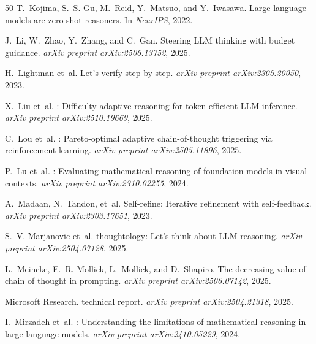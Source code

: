 \documentclass[11pt]{article}
\begin{document}
\begin{thebibliography}{50}
T.~Kojima, S.~S. Gu, M.~Reid, Y.~Matsuo, and Y.~Iwasawa.
\newblock Large language models are zero-shot reasoners.
\newblock In \emph{NeurIPS}, 2022.

J.~Li, W.~Zhao, Y.~Zhang, and C.~Gan.
\newblock Steering {LLM} thinking with budget guidance.
\newblock \emph{arXiv preprint arXiv:2506.13752}, 2025.

H.~Lightman et~al.
\newblock Let's verify step by step.
\newblock \emph{arXiv preprint arXiv:2305.20050}, 2023.

X.~Liu et~al.
: Difficulty-adaptive reasoning for token-efficient {LLM} inference.
\newblock \emph{arXiv preprint arXiv:2510.19669}, 2025.

C.~Lou et~al.
: Pareto-optimal adaptive chain-of-thought triggering via reinforcement learning.
\newblock \emph{arXiv preprint arXiv:2505.11896}, 2025.

P.~Lu et~al.
: Evaluating mathematical reasoning of foundation models in visual contexts.
\newblock \emph{arXiv preprint arXiv:2310.02255}, 2024.

A.~Madaan, N.~Tandon, et~al.
\newblock Self-refine: Iterative refinement with self-feedback.
\newblock \emph{arXiv preprint arXiv:2303.17651}, 2023.

S.~V. Marjanovic et~al.
 thoughtology: Let's think about {LLM} reasoning.
\newblock \emph{arXiv preprint arXiv:2504.07128}, 2025.

L.~Meincke, E.~R. Mollick, L.~Mollick, and D.~Shapiro.
\newblock The decreasing value of chain of thought in prompting.
\newblock \emph{arXiv preprint arXiv:2506.07142}, 2025.

Microsoft Research.
 technical report.
\newblock \emph{arXiv preprint arXiv:2504.21318}, 2025.

I.~Mirzadeh et~al.
: Understanding the limitations of mathematical reasoning in large language models.
\newblock \emph{arXiv preprint arXiv:2410.05229}, 2024.


\end{thebibliography}
\end{document}
